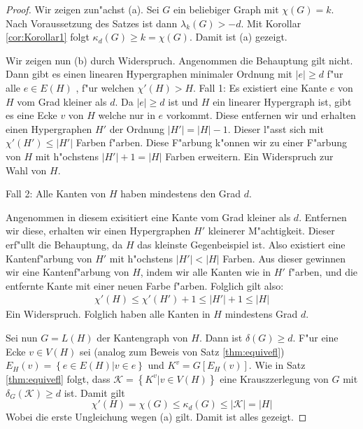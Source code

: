 \begin{proof}
  Wir zeigen zun"achst (a). Sei $G$ ein beliebiger Graph mit $\chi(G) = k$. Nach Voraussetzung des Satzes ist dann $\lambda_{k}\left( G \right) > -d$. Mit Korollar \ref{cor:Korollar1} folgt $\kappa_{d}\left( G \right) \geq k = \chi\left( G \right)$. 
  Damit ist (a) gezeigt. 

  Wir zeigen nun (b) durch Widerspruch. Angenommen die Behauptung gilt nicht. Dann gibt es einen linearen Hypergraphen minimaler Ordnung mit $|e| \geq d$ f"ur alle $e\in E(H)$ , f"ur welchen $\chi'(H) > H$. 
  Fall 1: Es existiert eine Kante $e$ von $H$ vom Grad kleiner als $d$. Da $|e| \geq d$ ist und $H$ ein linearer Hypergraph ist, gibt es eine Ecke $v$ von $H$ welche nur in $e$ vorkommt. Diese entfernen wir und erhalten einen Hypergraphen $H'$ der Ordnung $|H'| = |H|-1$. Dieser l"asst sich mit $\chi'(H') \leq |H'|$ Farben f"arben. Diese F"arbung k"onnen wir zu einer F"arbung von $H$ mit h"ochstens $|H'|+1 = |H|$ Farben erweitern. Ein Widerspruch zur Wahl von $H$.

  Fall 2: Alle Kanten von $H$ haben mindestens den Grad $d$. 

  Angenommen in diesem exisitiert eine Kante vom Grad kleiner als $d$. Entfernen wir diese, erhalten wir einen Hypergraphen $H'$ kleinerer M"achtigkeit.
  Dieser erf"ullt die Behauptung, da $H$ das kleinste Gegenbeispiel ist. Also existiert eine Kantenf"arbung von $H'$ mit h"ochstens $|H'| < |H|$ Farben. Aus dieser gewinnen wir eine Kantenf"arbung von $H$, indem wir alle Kanten wie in $H'$ f"arben, und die entfernte Kante mit einer neuen Farbe f"arben. Folglich gilt also:
  \begin{align*}
    \chi'(H) \leq \chi'(H') +1 \leq |H'|+1 \leq |H|
  \end{align*}
  Ein Widerspruch. Folglich haben alle Kanten in $H$ mindestens Grad $d$. 

  Sei nun $G=L(H)$ der Kantengraph von $H$. Dann ist $\delta(G) \geq d$. F"ur eine Ecke  $v\in V(H)$ sei (analog zum Beweis von  Satz \ref{thm:equivefl}) $E_{H}(v) = \left\{ e\in E(H) | v\in e \right\}$ und $K^{v} = G[E_{H}(v)]$. Wie in Satz \ref{thm:equivefl} folgt, dass $\mathcal{K}=\left\{ K^{v} | v \in V(H) \right\}$ eine Krauszzerlegung von $G$ mit $\delta_{G}(\mathcal{K}) \geq d$ ist. Damit gilt
  \begin{equation*}
    \chi'(H) = \chi(G) \leq \kappa_{d}(G) \leq |\mathcal{K}| = |H|
  \end{equation*}
  Wobei die erste Ungleichung wegen (a) gilt. Damit ist alles gezeigt. 
\end{proof}


